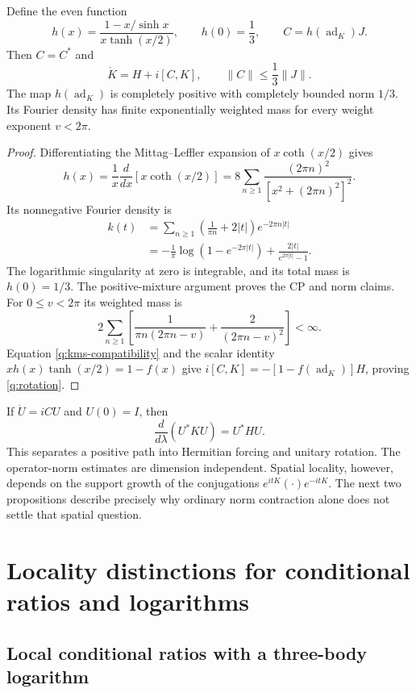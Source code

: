 \begin{proposition}
\label{q:prop-rotation}
Define the even function
\[
 h(x)=\frac{1-x/\sinh x}{x\tanh(x/2)},\qquad h(0)=\frac13,
 \qquad C=h(\operatorname{ad}_K)J.
\]
Then $C=C^*$ and
\begin{equation}
 \dot K=H+i[C,K],\qquad \|C\|\leq\frac13\|J\|.
 \label{q:rotation}
\end{equation}
The map $h(\operatorname{ad}_K)$ is completely positive with completely
bounded norm $1/3$.  Its Fourier density has finite exponentially
weighted mass for every weight exponent $v<2\pi$.
\end{proposition}

\begin{proof}
Differentiating the Mittag--Leffler expansion of $x\coth(x/2)$ gives
\[
 h(x)=\frac1x\frac{d}{dx}[x\coth(x/2)]
     =8\sum_{n\geq1}
       \frac{(2\pi n)^2}{[x^2+(2\pi n)^2]^2}.
\]
Its nonnegative Fourier density is
\begin{align*}
 k(t)
 &=\sum_{n\geq1}\left(\frac1{\pi n}+2|t|\right)e^{-2\pi n|t|}\\
 &=-\frac1\pi\log(1-e^{-2\pi|t|})
       +\frac{2|t|}{e^{2\pi|t|}-1}.
\end{align*}
The logarithmic singularity at zero is integrable, and its total mass
is $h(0)=1/3$.  The positive-mixture argument proves the CP and norm
claims.  For $0\leq v<2\pi$ its weighted mass is
\[
 2\sum_{n\geq1}\left[
 \frac1{\pi n(2\pi n-v)}+
 \frac2{(2\pi n-v)^2}\right]<\infty.
\]
Equation \eqref{q:kms-compatibility} and the scalar identity
$xh(x)\tanh(x/2)=1-f(x)$ give
$i[C,K]=-[1-f(\operatorname{ad}_K)]H$, proving
\eqref{q:rotation}.
\end{proof}

If $\dot U=iCU$ and $U(0)=I$, then
\[
 \frac{d}{d\lambda}(U^*KU)=U^*HU.
\]
This separates a positive path into Hermitian forcing and unitary
rotation.  The operator-norm estimates are dimension independent.
Spatial locality, however, depends on the support growth of the
conjugations $e^{itK}(\cdot)e^{-itK}$.  The next two propositions
describe precisely why ordinary norm contraction alone does not settle
that spatial question.

\section{Locality distinctions for conditional ratios and logarithms}
\label{q:sec-obstructions}

\subsection{Local conditional ratios with a three-body logarithm}

